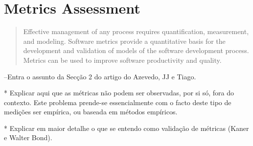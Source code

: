 \section{Metrics Assessment}

\begin{quotation}
Effective management of any process requires quantification, measurement, and modeling. Software metrics provide a quantitative basis for the development and validation of models of the software development process. Metrics can be used to improve software productivity and quality.\cite{g1:Millis:1998}
\end{quotation}


--Entra o assunto da Secção 2 do artigo do Azevedo, JJ e Tiago.

    * Explicar aqui que as métricas não podem ser observadas, por si só, fora do contexto. Este problema prende-se essencialmente com o facto deste tipo de medições ser empírica, ou baseada em métodos empíricos.

    * Explicar em maior detalhe o que se entendo como validação de métricas (Kaner e Walter Bond).